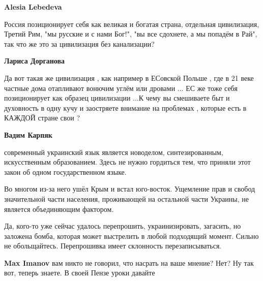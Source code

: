 \begin{itemize}
\begin{itemize}
 
\textbf{Alesia Lebedeva} 

Россия позиционирует себя как великая и богатая страна, отдельная цивилизация,
Третий Рим, "мы русские и с нами Бог!", "вы все сдохнете, а мы попадём в Рай",
так что же это за цивилизация без канализации?


 
\textbf{Лариса Дорганова} 

Да вот такая же цивилизация , как например в ЕСовской Польше , где в 21 веке
частные дома отапливают вонючим углём или дровами ... ЕС же тоже себя
позиционирует как образец цивилизации ...К чему вы смешиваете быт и духовность
в одну кучу и заостряете внимание на проблемах , которые есть в КАЖДОЙ стране
свои ?

 
\textbf{Вадим Карпяк} 

современный украинский язык является новоделом, синтезированным, искусственным
образованием. Здесь не нужно гордиться тем, что приняли этот закон об одном
государственном языке. 

Во многом из-за него ушёл Крым и встал юго-восток.  Ущемление прав и свобод
значительной части населения, проживающей на остальной части Украины, не
является объединяющим фактором. 

Да, кого-то уже сейчас удалось перепрошить, украинизировать, загасить, но
заложена бомба, которая может выстрелить в любой подходящий момент. Сильно не
обольщайтесь.  Перепрошивка имеет склонность перезаписываться.

 
\textbf{Max Imanov} вам никто не говорил, что насрать на ваше мнение? Нет? Ну так вот, теперь знаете. В своей Пензе уроки давайте


\end{itemize}
\end{itemize}
